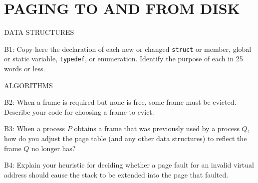 \section*{PAGING TO AND FROM DISK}

\begin{aspect}{DATA STRUCTURES}

	\begin{qc}
		B1: Copy here the declaration of each new or changed \lstinline{struct} or member,
		global or static variable, \lstinline{typedef}, or enumeration.
		Identify the purpose of each in 25 words or less.
	\end{qc}

\end{aspect}

\begin{aspect}{ALGORITHMS}
	\begin{qc}
		B2: When a frame is required but none is free, some frame must be
		evicted.  Describe your code for choosing a frame to evict.
	\end{qc}

	\begin{qc}
		B3: When a process $P$ obtains a frame that was previously used by a process $Q$,
		how do you adjust the page table (and any other data structures) to reflect the frame $Q$ no longer has?
	\end{qc}

	\begin{qc}
		B4: Explain your heuristic for deciding whether a page fault for an invalid virtual address
		should cause the stack to be extended into the page that faulted.
	\end{qc}

\end{aspect}

